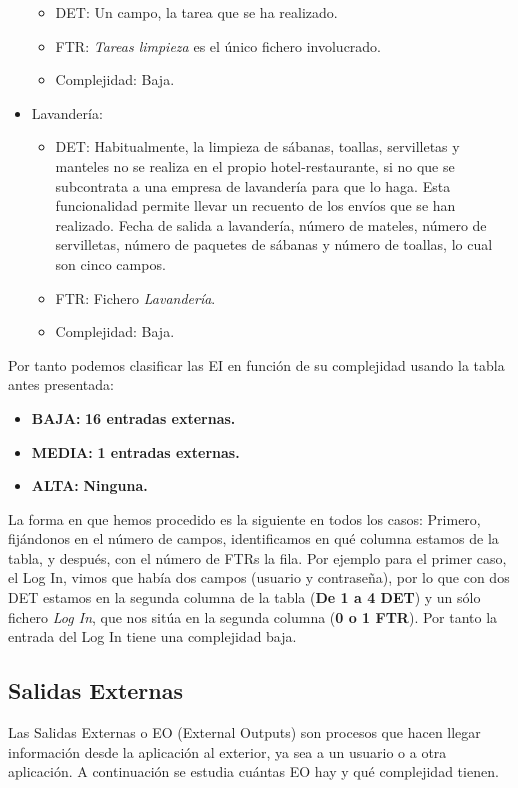 \documentclass[spanish,a4paper,11pt, twoside]{report}	%
\begin{document}
\begin{itemize}
		\begin{itemize}
 			\item{DET:} Un campo, la tarea que se ha realizado.
			\item{FTR:} \textit{Tareas limpieza} es el único fichero involucrado.
			\item{Complejidad:} Baja.
		\end{itemize}
		\item{Lavandería:} 
		\begin{itemize}
 			\item{DET:} Habitualmente, la limpieza de sábanas, toallas, servilletas y manteles no se realiza en el propio hotel-restaurante, si no que se subcontrata a una empresa de lavandería para que lo haga. Esta funcionalidad permite llevar un recuento de los envíos que se han realizado. Fecha de salida a lavandería, número de mateles, número de servilletas, número de paquetes de sábanas y número de toallas, lo cual son cinco campos.
			\item{FTR:} Fichero \textit{Lavandería}.
			\item{Complejidad:} Baja.
		\end{itemize}		
	\end{itemize}

	Por tanto podemos clasificar las EI en función de su complejidad usando la tabla antes presentada:
	\begin{itemize}
	\item{\textbf{BAJA:}} \textbf{16 entradas externas.}
	\item{\textbf{MEDIA:}} \textbf{1 entradas externas.}
	\item{\textbf{ALTA:}} \textbf{Ninguna.}
	\end{itemize}
	
	La forma en que hemos procedido es la siguiente en todos los casos: Primero, fijándonos en el número de campos, identificamos en qué columna estamos de la tabla, y después, con el número de FTRs la fila. Por ejemplo para el primer caso, el Log In, vimos que había dos campos (usuario y contraseña), por lo que con dos DET estamos en la segunda columna de la tabla (\textbf{De 1 a 4 DET}) y un sólo fichero \textit{Log In}, que nos sitúa en la segunda columna (\textbf{0 o 1 FTR}). Por tanto la entrada del Log In tiene una complejidad baja.

	\subsection{Salidas Externas}
	Las Salidas Externas o EO (External Outputs) son procesos que hacen llegar información desde la aplicación al exterior, ya sea a un usuario o a otra aplicación. A continuación se estudia cuántas EO hay y qué complejidad tienen. 
\end{document}
